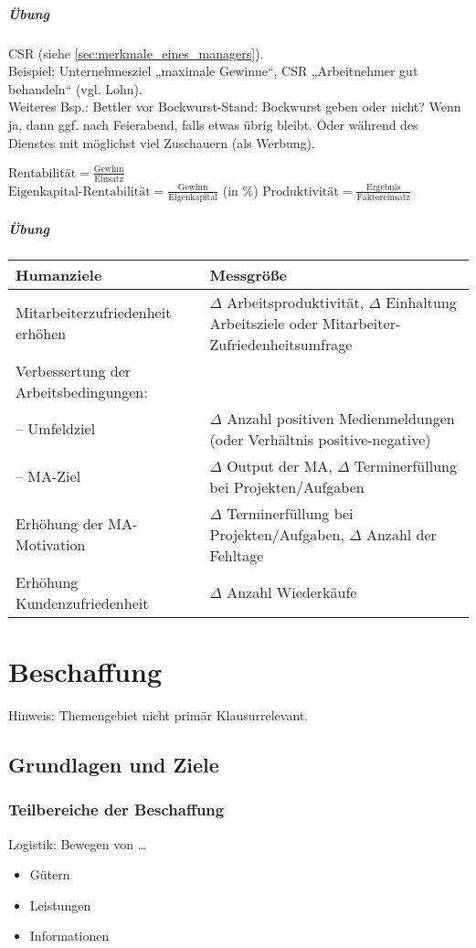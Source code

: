 \documentclass{scrreprt}
\begin{document}
\paragraph{Übung} CSR (siehe \ref{sec:merkmale_eines_managers}). \\
Beispiel: Unternehmesziel „maximale Gewinne“, CSR „Arbeitnehmer gut behandeln“ (vgl. Lohn).\\
Weiteres Bsp.: Bettler vor Bockwurst-Stand: Bockwurst geben oder nicht? Wenn ja, dann ggf. nach Feierabend, falls etwas übrig bleibt. Oder während des Dienstes mit möglichst viel Zuschauern (als Werbung).

$\text{Rentabilität} = \frac{\text{Gewinn}}{\text{Einsatz}}$\\
$\text{Eigenkapital-Rentabilität} = \frac{\text{Gewinn}}{\text{Eigenkapital}}$ (in \%)
$\text{Produktivität} = \frac{\text{Ergebnis}}{\text{Faktoreinsatz}}$
\paragraph{Übung}\parskp
\begin{tabular}{L{0.3} L{0.7}}
Humanziele & Messgröße\tabularnewline
\hline
Mitarbeiterzufriedenheit erhöhen & $\Delta$ Arbeitsproduktivität, $\Delta$ Einhaltung Arbeitsziele oder Mitarbeiter-Zufriedenheitsumfrage\tabularnewline
Verbessertung der Arbeitsbedingungen: & \tabularnewline
-- Umfeldziel & $\Delta$ Anzahl positiven Medienmeldungen (oder Verhältnis positive-negative)\tabularnewline
-- MA-Ziel & $\Delta$ Output der MA, $\Delta$ Terminerfüllung bei Projekten/Aufgaben \tabularnewline
Erhöhung der MA-Motivation & $\Delta$ Terminerfüllung bei Projekten/Aufgaben, $\Delta$ Anzahl der Fehltage \tabularnewline
Erhöhung Kundenzufriedenheit & $\Delta$ Anzahl Wiederkäufe \tabularnewline
\end{tabular}

\chapter{Beschaffung}
Hinweis: Themengebiet nicht primär Klausurrelevant.
\section{Grundlagen und Ziele}
\subsection{Teilbereiche der Beschaffung}
Logistik: Bewegen von …
\begin{itemize}
\item Gütern
\item Leistungen
\item Informationen
\end{itemize}
\end{document}
